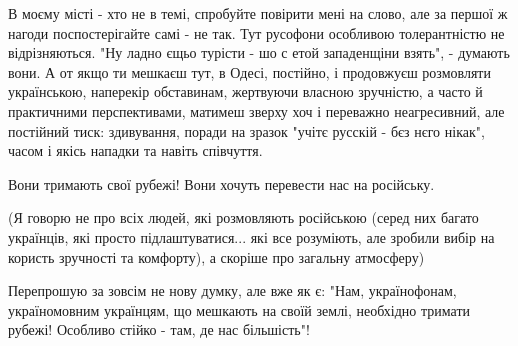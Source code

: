 В моєму місті - хто не в темі, спробуйте повірити мені на слово, але за першої
ж нагоди поспостерігайте самі - не так. Тут русофони особливою толерантністю не
відрізняються. "Ну ладно єщьо турісти - шо с етой западенщіни взять", - думають
вони. А от якщо ти мешкаєш тут, в Одесі, постійно, і продовжуєш розмовляти
українською, наперекір обставинам, жертвуючи власною зручністю, а часто й
практичними перспективами, матимеш зверху хоч і переважно неагресивний, але
постійний тиск: здивування, поради на зразок "учітє русскій - бєз нєго нікак",
часом і якісь нападки та навіть співчуття.

Вони тримають свої рубежі! Вони хочуть перевести нас на російську. 

(Я говорю не про всіх людей, які розмовляють російською (серед них багато
українців, які просто підлаштуватися... які все розуміють, але зробили вибір на
користь зручності та комфорту), а скоріше про загальну атмосферу)

Перепрошую за зовсім не нову думку, але вже як є: "Нам, українофонам,
україномовним українцям, що мешкають на своїй землі, необхідно тримати рубежі!
Особливо стійко - там, де нас більшість"!


